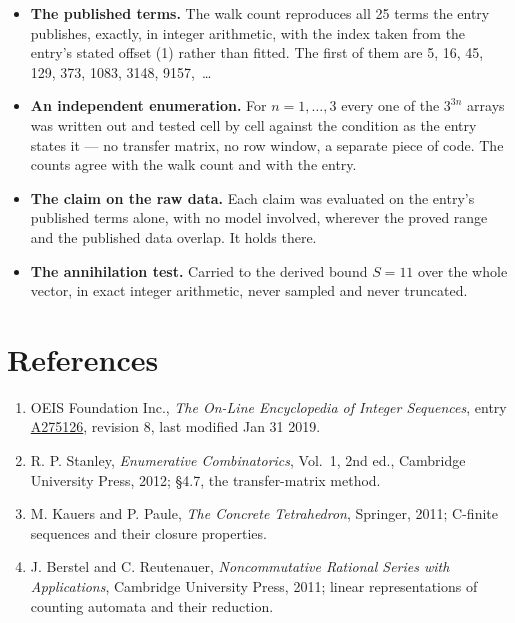 \documentclass[11pt]{article}
\theoremstyle{definition}
\begin{document}
\begin{itemize}

\item {\bfseries The published terms.} The walk count reproduces all 25 terms the entry publishes, exactly, in integer arithmetic, with the index taken from the entry's stated offset (1) rather than fitted. The first of them are 5, 16, 45, 129, 373, 1083, 3148, 9157,~\dots

\item {\bfseries An independent enumeration.} For $n = 1,\dots,3$ every one of the $3^{3n}$ arrays was written out and tested cell by cell against the condition as the entry states it --- no transfer matrix, no row window, a separate piece of code. The counts agree with the walk count and with the entry.

\item {\bfseries The claim on the raw data.} Each claim was evaluated on the entry's published terms alone, with no model involved, wherever the proved range and the published data overlap. It holds there.

\item {\bfseries The annihilation test.} Carried to the derived bound $S = 11$ over the whole vector, in exact integer arithmetic, never sampled and never truncated.

\end{itemize}

\section{References}

\begin{enumerate}

\item OEIS Foundation Inc., \emph{The On-Line Encyclopedia of Integer Sequences}, entry \href{https://oeis.org/A275126}{A275126}, revision 8, last modified Jan 31 2019.

\item R. P. Stanley, \emph{Enumerative Combinatorics}, Vol.~1, 2nd ed., Cambridge University Press, 2012; \S4.7, the transfer-matrix method.

\item M. Kauers and P. Paule, \emph{The Concrete Tetrahedron}, Springer, 2011; C-finite sequences and their closure properties.

\item J. Berstel and C. Reutenauer, \emph{Noncommutative Rational Series with Applications}, Cambridge University Press, 2011; linear representations of counting automata and their reduction.

\end{enumerate}
\end{document}
